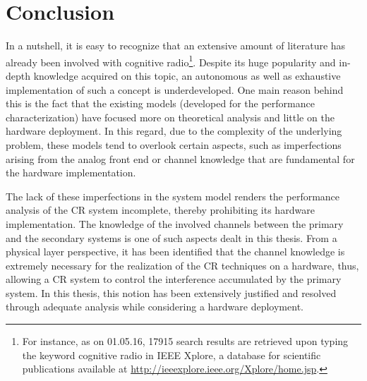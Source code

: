 \chapter{Conclusion}
\label{chap:Con}

In a nutshell, it is easy to recognize that an extensive amount of literature has already been involved with cognitive radio\footnote{For instance, as on 01.05.16, 17915 search results are retrieved upon typing the keyword cognitive radio in IEEE Xplore, a database for scientific publications available at \url{http://ieeexplore.ieee.org/Xplore/home.jsp}.}. Despite its huge popularity and in-depth knowledge acquired on this topic, an autonomous as well as exhaustive implementation of such a concept is underdeveloped. One main reason behind this is the fact that the existing models (developed for the performance characterization) have focused more on theoretical analysis and little on the hardware deployment. In this regard, due to the complexity of the underlying problem, these models tend to overlook certain aspects, such as imperfections arising from the analog front end or channel knowledge that are fundamental for the hardware implementation. 

The lack of these imperfections in the system model renders the performance analysis of the CR system incomplete, thereby prohibiting its hardware implementation. The knowledge of the involved channels between the primary and the secondary systems is one of such aspects dealt in this thesis. 
From a physical layer perspective, it has been identified that the channel knowledge is extremely necessary for the realization of the CR techniques on a hardware, thus, allowing a CR system to control the interference accumulated by the primary system. In this thesis, this notion has been extensively justified and resolved through adequate analysis while considering a hardware deployment. %


